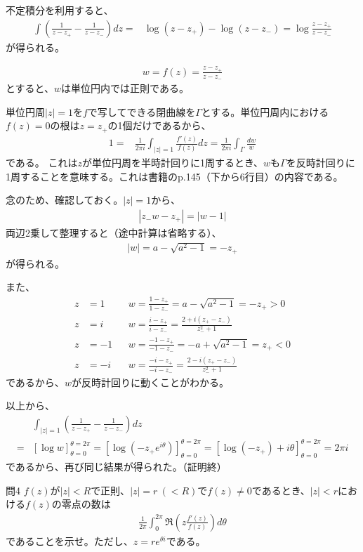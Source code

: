 不定積分を利用すると、
\begin{align*}
    \int\left(\frac{1}{z-z_+}-\frac{1}{z-z_-}\right)dz
    =&\log(z-z_+)-\log(z-z_-)
    =\log\frac{z-z_+}{z-z_-}
\end{align*}
が得られる。

\begin{align*}
    w=f(z)=\frac{z-z_+}{z-z_-}
\end{align*}
とすると、$w$は単位円内では正則である。

単位円周$|z|=1$を$f$で写してできる閉曲線を$\Gamma$とする。単位円周内における$f(z)=0$の根は$z=z_+$の1個だけであるから、
\begin{align*}
    1
    =&\frac{1}{2\pi i}\int_{|z|=1}\frac{f'(z)}{f(z)}dz
    =\frac{1}{2\pi i}\int_{\Gamma}\frac{dw}{w}
\end{align*}
である。
これは$z$が単位円周を半時計回りに1周するとき、$w$も$\Gamma$を反時計回りに1周することを意味する。これは書籍のp.145（下から6行目）の内容である。

念のため、確認しておく。$|z|=1$から、
\begin{align*}
    |z_-w-z_+|=|w-1|
\end{align*}
両辺2乗して整理すると（途中計算は省略する）、
\begin{align*}
    |w|=a-\sqrt{a^2-1}=-z_+
\end{align*}
が得られる。

また、
\begin{align*}
    z&=1& &w=\frac{1-z_+}{1-z_-}=a-\sqrt{a^2-1}=-z_+>0\\
    z&=i& &w=\frac{i-z_+}{i-z_-}=\frac{2+i(z_+-z_-)}{z_-^2+1}\\
    z&=-1& &w=\frac{-1-z_+}{-1-z_-}=-a+\sqrt{a^2-1}=z_+<0\\
    z&=-i& &w=\frac{-i-z_+}{-i-z_-}=\frac{2-i(z_+-z_-)}{z_-^2+1}
\end{align*}
であるから、$w$が反時計回りに動くことがわかる。

以上から、
\begin{align*}
    &\int_{|z|=1}\left(\frac{1}{z-z_+}-\frac{1}{z-z_-}\right)dz\\
    =&\left[\log w\right]_{\theta=0}^{\theta=2\pi}
    =\left[\log(-z_+e^{i\theta})\right]_{\theta=0}^{\theta=2\pi}
    =\left[\log(-z_+)+i\theta\right]_{\theta=0}^{\theta=2\pi}
    =2\pi i
\end{align*}
であるから、再び同じ結果が得られた。（証明終）

\newpage
\begin{mysimplebox}{問4}
    $f(z)$が$|z|<R$で正則、$|z|=r\ (<R)$で$f(z)\neq0$であるとき、$|z|<r$における$f(z)$の零点の数は
    \begin{align*}
        \frac{1}{2\pi}\int_{0}^{2\pi}\Re\left(z\frac{f'(z)}{f(z)}\right)d\theta
    \end{align*}
    であることを示せ。ただし、$z=re^{\theta i}$である。
\end{mysimplebox}
